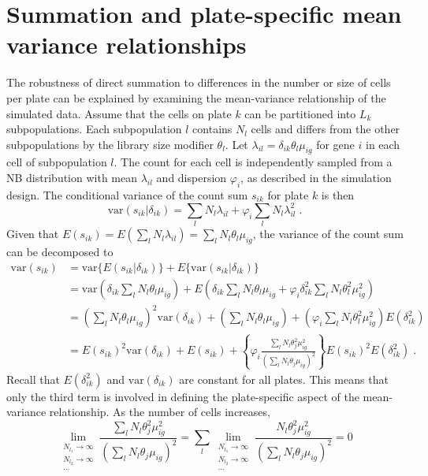 \documentclass{article}
\begin{document}
\section{Summation and plate-specific mean variance relationships}
The robustness of direct summation to differences in the number or size of cells per plate can be explained by examining the mean-variance relationship of the simulated data.
Assume that the cells on plate $k$ can be partitioned into $L_k$ subpopulations.
Each subpopulation $l$ contains $N_l$ cells and differs from the other subpopulations by the library size modifier $\theta_l$.
Let $\lambda_{il} = \delta_{ik}\theta_{l}\mu_{ig}$ for gene $i$ in each cell of subpopulation $l$.
The count for each cell is independently sampled from a NB distribution with mean $\lambda_{il}$ and dispersion $\varphi_i$, as described in the simulation design.
The conditional variance of the count sum $s_{ik}$ for plate $k$ is then
\[
    \mbox{var}(s_{ik} | \delta_{ik}) = \sum_{l} N_l \lambda_{il}  + \varphi_{i} \sum_{l} N_l \lambda_{il}^2 \;.
\]
Given that $E(s_{ik}) = E(\sum_l N_l\lambda_{il}) = \sum_l N_l \theta_l \mu_{ig}$, the variance of the count sum can be decomposed to
\begin{align*}
    \mbox{var}(s_{ik}) 
    &= \mbox{var}\{E(s_{ik} | \delta_{ik} ) \} + E\{ \mbox{var}(s_{ik} | \delta_{ik}) \}\\
    &= \mbox{var}\left(\delta_{ik}\sum_l N_l \theta_{l}\mu_{ig}\right) + E\left(\delta_{ik}\sum_l  N_l\theta_l\mu_{ig}  + \varphi_{i} \delta_{ik}^2 \sum_l  N_l\theta_l^2\mu_{ig}^2\right)\\
    &= \left(\sum_l N_l \theta_{l}\mu_{ig} \right)^2 \mbox{var}(\delta_{ik}) + \left(\sum_l N_l \theta_{l}\mu_{ig}\right) + \left( \varphi_i \sum_l  N_l\theta_l^2\mu_{ig}^2 \right) E(\delta_{ik}^2) \\
    &= E(s_{ik})^2 \mbox{var}(\delta_{ik}) + E(s_{ik}) + \left\{ \varphi_i \frac{\sum_l N_l \theta_j^2\mu_{ig}^2}{ (\sum_l N_l \theta_j\mu_{ig})^2}  \right\} E(s_{ik})^2 E(\delta_{ik}^2) \;. 
\end{align*}
Recall that $E(\delta_{ik}^2)$ and $\mbox{var}(\delta_{ik})$ are constant for all plates.
This means that only the third term is involved in defining the plate-specific aspect of the mean-variance relationship.
As the number of cells increases,
\[
    \lim_{\substack{N_{l_1} \to \infty \\ N_{l_2} \to \infty \\ \dots}} \frac{\sum_l N_l \theta_j^2\mu_{ig}^2}{ (\sum_l N_l \theta_j\mu_{ig})^2} 
    = \sum_l \lim_{\substack{N_{l_1} \to \infty \\ N_{l_2} \to \infty \\ \dots}} \frac{N_l \theta_j^2\mu_{ig}^2}{ (\sum_l N_l \theta_j\mu_{ig})^2} 
= 0
\]
\end{document}

